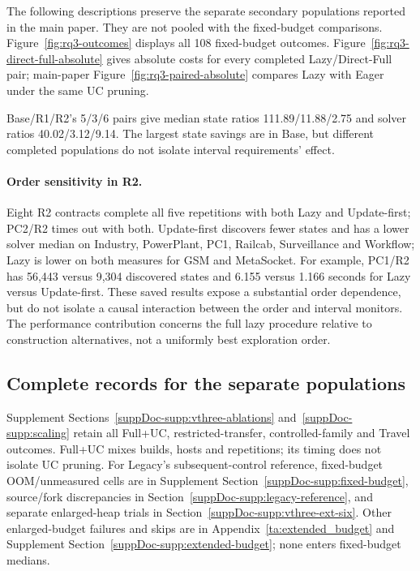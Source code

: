 The following descriptions preserve the separate secondary populations reported in the main paper. They are not pooled with the fixed-budget comparisons.
Figure~\ref{fig:rq3-outcomes} displays all 108 fixed-budget outcomes. Figure~\ref{fig:rq3-direct-full-absolute} gives absolute costs for every completed Lazy/Direct-Full pair; main-paper Figure~\ref{fig:rq3-paired-absolute} compares Lazy with Eager under the same UC pruning.

\FloatBarrier
Base/R1/R2's 5/3/6 pairs give median state ratios 111.89/11.88/2.75 and solver ratios 40.02/3.12/9.14. The largest state savings are in Base, but different completed populations do not isolate interval requirements' effect.

\paragraph{Order sensitivity in R2.}
Eight R2 contracts complete all five repetitions with both Lazy and Update-first; PC2/R2 times out with both. Update-first discovers fewer states and has a lower solver median on Industry, PowerPlant, PC1, Railcab, Surveillance and Workflow; Lazy is lower on both measures for GSM and MetaSocket. For example, PC1/R2 has 56,443 versus 9,304 discovered states and 6.155 versus 1.166 seconds for Lazy versus Update-first. These saved results expose a substantial order dependence, but do not isolate a causal interaction between the order and interval monitors. The performance contribution concerns the full lazy procedure relative to construction alternatives, not a uniformly best exploration order.

\subsection{Complete records for the separate populations}
Supplement Sections~\ref{suppDoc-supp:vthree-ablations} and~\ref{suppDoc-supp:scaling} retain all Full+UC, restricted-transfer, controlled-family and Travel outcomes. Full+UC mixes builds, hosts and repetitions; its timing does not isolate UC pruning. For Legacy's subsequent-control reference, fixed-budget OOM/unmeasured cells are in Supplement Section~\ref{suppDoc-supp:fixed-budget}, source/fork discrepancies in Section~\ref{suppDoc-supp:legacy-reference}, and separate enlarged-heap trials in Section~\ref{suppDoc-supp:vthree-ext-six}. Other enlarged-budget failures and skips are in Appendix~\ref{ta:extended_budget} and Supplement Section~\ref{suppDoc-supp:extended-budget}; none enters fixed-budget medians.

